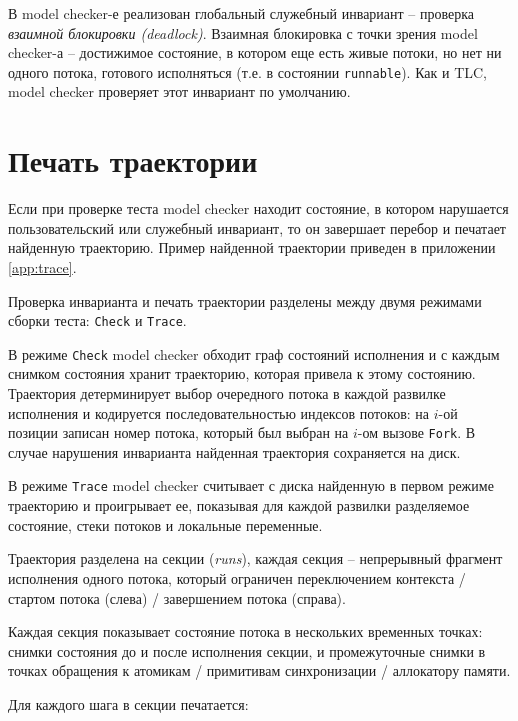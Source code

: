 \fi

В model checker-е реализован глобальный служебный инвариант – проверка \emph{взаимной блокировки (deadlock)}. Взаимная блокировка с точки зрения model checker-а – достижимое состояние, в котором еще есть живые потоки, но нет ни одного потока, готового исполняться (т.е. в состоянии \texttt{runnable}). Как и TLC, model checker проверяет этот инвариант по умолчанию.  


\section{Печать траектории}

Если при проверке теста model checker находит состояние, в котором нарушается пользовательский или служебный инвариант, то он завершает перебор и печатает найденную траекторию. Пример найденной траектории приведен в приложении \ref{app:trace}.

Проверка инварианта и печать траектории разделены между двумя режимами сборки теста: \texttt{Check} и \texttt{Trace}.

В режиме \texttt{Check} model checker обходит граф состояний исполнения и с каждым снимком состояния хранит траекторию, которая привела к этому состоянию. Траектория детерминирует выбор очередного потока в каждой развилке исполнения и кодируется последовательностью индексов потоков: на $i$-ой позиции записан номер потока, который был выбран на $i$-ом вызове \texttt{Fork}. В случае нарушения инварианта найденная траектория сохраняется на диск.

В режиме \texttt{Trace} model checker считывает с диска найденную в первом режиме траекторию и проигрывает ее, показывая для каждой развилки разделяемое состояние, стеки потоков и локальные переменные.  

Траектория разделена на секции (\emph{runs}), каждая секция – непрерывный фрагмент исполнения одного потока, который ограничен переключением контекста / стартом потока (слева) / завершением потока (справа).

Каждая секция показывает состояние потока в нескольких временных точках: снимки состояния до и после исполнения секции, и промежуточные снимки в точках обращения к атомикам / примитивам синхронизации / аллокатору памяти.

Для каждого шага в секции печатается:

